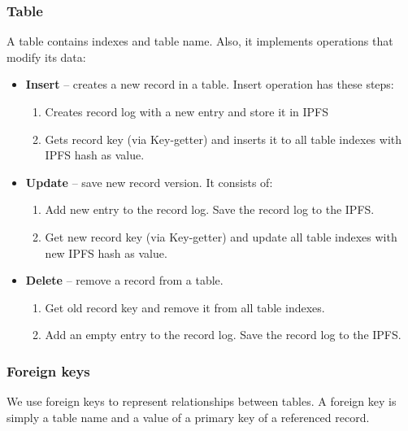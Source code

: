 \subsubsection{Table}
A table contains indexes and table name. Also, it implements operations that modify its data:
\begin{itemize}
    \item \textbf{Insert} -- creates a new record in a table. Insert operation has these steps: 
        \begin{enumerate}
            \item Creates record log with a new entry and store it in IPFS
            \item Gets record key (via Key-getter) and inserts it to all table indexes with IPFS hash as value.
        \end{enumerate}
    \item \textbf{Update} -- save new record version. It consists of:
        \begin{enumerate}
            \item Add new entry to the record log. Save the record log to the IPFS.
            \item Get new record key (via Key-getter) and update all table indexes with new IPFS hash as value.
        \end{enumerate}
    \item \textbf{Delete} -- remove a record from a table. 
        \begin{enumerate}
            \item Get old record key and remove it from all table indexes.
            \item Add an empty entry to the record log. Save the record log to the IPFS.
        \end{enumerate}
\end{itemize}

\subsubsection{Foreign keys}
We use foreign keys to represent relationships between tables. A foreign key is simply a table name and a value of a primary key of a referenced record.

